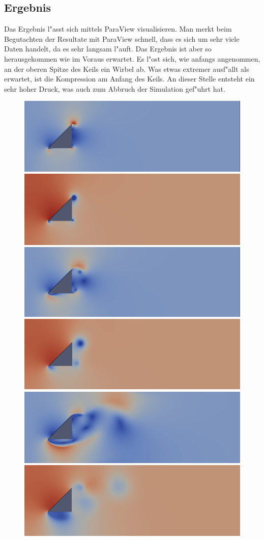 \begin{refsection}
\subsection{Ergebnis}
Das Ergebnis l"asst sich mittels ParaView visualisieren. Man merkt beim
Begutachten der Resultate mit ParaView schnell, dass es sich um sehr
viele Daten handelt, da es sehr langsam l"auft. Das Ergebnis ist aber
so herausgekommen wie im Voraus erwartet. Es l"ost sich, wie anfangs
angenommen, an der oberen Spitze des Keils ein Wirbel ab. Was etwas
extremer ausf"allt als erwartet, ist die Kompression am Anfang des
Keils. An dieser Stelle entsteht ein sehr hoher Druck, was auch zum
Abbruch der Simulation gef"uhrt hat.
\begin{figure}
\begin{center}
\includegraphics[width = 0.49\hsize]{./openfoam/pics/U1.png}
\includegraphics[width = 0.49\hsize]{./openfoam/pics/p1.png}
\\[0.5mm]
\includegraphics[width = 0.49\hsize]{./openfoam/pics/U5.png}
\includegraphics[width = 0.49\hsize]{./openfoam/pics/p5.png}
\\[0.5mm]
\includegraphics[width = 0.49\hsize]{./openfoam/pics/U25.png}
\includegraphics[width = 0.49\hsize]{./openfoam/pics/p25.png}

\end{center}
\end{figure}
\end{refsection}
